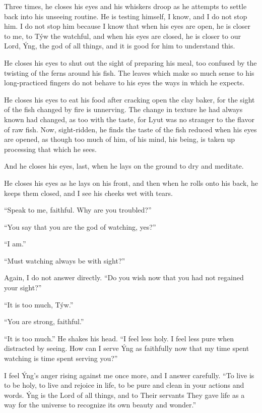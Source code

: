 Three times, he closes his eyes and his whiskers droop as he attempts to settle back into his unseeing routine. He is testing himself, I know, and I do not stop him. I do not stop him because I know that when his eyes are open, he is closer to me, to Týw the watchful, and when his eyes are closed, he is closer to our Lord, Ýng, the god of all things, and it is good for him to understand this.

He closes his eyes to shut out the sight of preparing his meal, too confused by the twisting of the ferns around his fish. The leaves which make so much sense to his long-practiced fingers do not behave to his eyes the ways in which he expects.

He closes his eyes to eat his food after cracking open the clay baker, for the sight of the fish changed by fire is unnerving. The change in texture he had always known had changed, as too with the taste, for Lyut was no stranger to the flavor of raw fish. Now, sight-ridden, he finds the taste of the fish reduced when his eyes are opened, as though too much of him, of his mind, his being, is taken up processing that which he sees.

And he closes his eyes, last, when he lays on the ground to dry and meditate.

He closes his eyes as he lays on his front, and then when he rolls onto his back, he keeps them closed, and I see his cheeks wet with tears.

``Speak to me, faithful. Why are you troubled?''

``You say that you are the god of watching, yes?''

``I am.''

``Must watching always be with sight?''

Again, I do not answer directly. ``Do you wish now that you had not regained your sight?''

``It is too much, Týw.''

``You are strong, faithful.''

``It is too much.'' He shakes his head. ``I feel less holy. I feel less pure when distracted by seeing. How can I serve Ýng as faithfully now that my time spent watching is time spent serving you?''

I feel Ýng's anger rising against me once more, and I answer carefully. ``To live is to be holy, to live and rejoice in life, to be pure and clean in your actions and words. Ýng is the Lord of all things, and to Their servants They gave life as a way for the universe to recognize its own beauty and wonder.''


